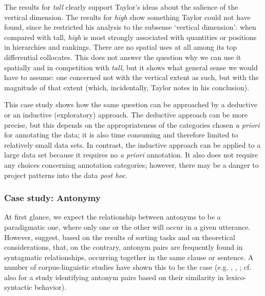 The results for \textit{tall} clearly support Taylor's ideas about the salience of the vertical dimension. The results for \textit{high} show something Taylor could not have found, since he restricted his analysis to the subsense `vertical dimension': when compared with tall, \textit{high} is most strongly associated  with quantities or positions in hierarchies and rankings. There are no spatial uses at all among its top differential collocates.  This does not answer the question why we can use it spatially and in competition with \textit{tall}, but it shows what general sense we would have to assume: one concerned not with the vertical extent as such, but with the magnitude of that extent (which, incidentally, Taylor notes in his conclusion).

This case study shows how the same question can be approached by a deductive  or an inductive  (exploratory)  approach. The deductive approach can be more precise, but this depends on the appropriateness of the categories  chosen \textit{a priori} for annotating  the data; it is also time consuming and therefore limited to relatively small data sets. In contrast, the inductive  approach can be applied to a large  data set because it requires no \textit{a priori} annotation.  It also does not require any choices concerning annotation categories;  however, there may be a danger to project patterns into the data \textit{post hoc}.

\subsubsection{Case study: Antonymy}\label{sec:antonymy}\largerpage

At first glance, we expect the relationship between antonyms  to be a paradigmatic  one, where only one or the other will occur in a given utterance. However, \citet{charles_contexts_1989} suggest, based on the results of sorting tasks and on theoretical considerations, that, on the contrary, antonym pairs are frequently found in syntagmatic  relationships, occurring together in the same clause or sentence. A number of corpus\hyp{}linguistic studies have shown this to be the case (e.g. \citealt{justeson_co-occurrences_1991}, \citealt{justeson_redefining_1992}, \citealt{fellbaum_co-occurrence_1995}; cf. also \citealt{gries_behavioral_2010} for a study identifying antonym  pairs based on their similarity in lexico\hyp{}syntactic  behavior).

